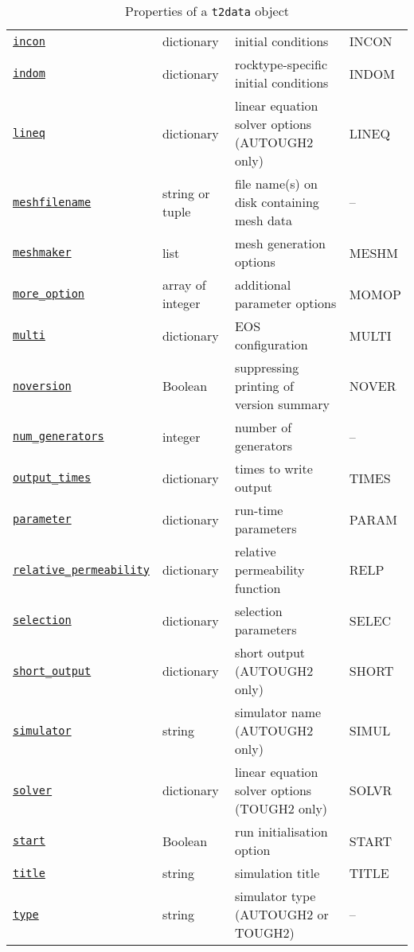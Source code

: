\begin{sidewaystable}
\begin{center}
\begin{tabular}{|l|l|l|l|}
      \hyperref[sec:t2data:incon]{\texttt{incon}} & dictionary & initial conditions & INCON\\
      \hyperref[sec:t2data:indom]{\texttt{indom}} & dictionary & rocktype-specific initial conditions & INDOM\\
      \hyperref[sec:t2data:lineq]{\texttt{lineq}} & dictionary & linear equation solver options (AUTOUGH2 only) & LINEQ\\
      \hyperref[sec:t2data:meshfilename]{\texttt{meshfilename}} & string or tuple & file name(s) on disk containing mesh data & --\\
      \hyperref[sec:t2data:meshmaker]{\texttt{meshmaker}} & list & mesh generation options & MESHM\\
      \hyperref[sec:t2data:more_options]{\texttt{more\_option}} & array of integer & additional parameter options & MOMOP\\
      \hyperref[sec:t2data:multi]{\texttt{multi}} & dictionary & EOS configuration & MULTI\\
      \hyperref[sec:t2data:noversion]{\texttt{noversion}} & Boolean & suppressing printing of version summary & NOVER\\
      \hyperref[sec:t2data:num_generators]{\texttt{num\_generators}} & integer & number of generators & --\\
      \hyperref[sec:t2data:output_times]{\texttt{output\_times}} & dictionary & times to write output & TIMES\\
      \hyperref[sec:t2data:parameter]{\texttt{parameter}} & dictionary & run-time parameters & PARAM\\
      \hyperref[sec:t2data:relative_permeability]{\texttt{relative\_permeability}} & dictionary & relative permeability function & RELP\\
      \hyperref[sec:t2data:selection]{\texttt{selection}} & dictionary & selection parameters & SELEC\\
      \hyperref[sec:t2data:short_output]{\texttt{short\_output}} & dictionary & short output (AUTOUGH2 only) & SHORT\\
      \hyperref[sec:t2data:simulator]{\texttt{simulator}} & string & simulator name (AUTOUGH2 only) & SIMUL\\
      \hyperref[sec:t2data:solver]{\texttt{solver}} & dictionary & linear equation solver options (TOUGH2 only) & SOLVR\\
      \hyperref[sec:t2data:start]{\texttt{start}} & Boolean & run initialisation option & START\\
      \hyperref[sec:t2data:title]{\texttt{title}} & string & simulation title & TITLE\\
      \hyperref[sec:t2data:type]{\texttt{type}} & string & simulator type (AUTOUGH2 or TOUGH2) & --\\
      \hline
    \end{tabular}
    \caption{Properties of a \texttt{t2data} object}
    \label{tb:t2data_properties}
  \end{center}
\end{sidewaystable}

